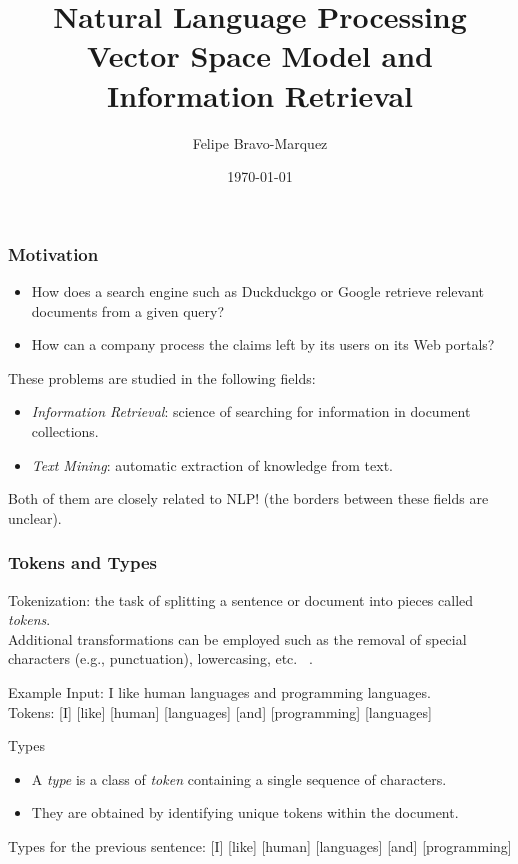 \documentclass[handout]{beamer}
\title{Natural Language Processing \\ Vector Space Model and Information Retrieval}
\author[Felipe Bravo Márquez]{\footnotesize
 \textcolor[rgb]{0.00,0.00,1.00}{Felipe Bravo-Marquez}}
\date{\today}
\begin{document}
\begin{frame}
\titlepage


\end{frame}

\begin{frame}\frametitle{Motivation}


  \begin{itemize}
   \item How does a search engine such as Duckduckgo or Google retrieve relevant documents from a given query?
   \item How can a company process the claims left by its users on its Web portals?
  \end{itemize}

These problems are studied in the following fields:

\begin{itemize}
 \item \emph{Information Retrieval}:  science of searching for information in  document collections.
 \item \emph{Text Mining}: automatic extraction of knowledge from text.
\end{itemize}

Both of them are closely related to NLP! (the borders between these fields are unclear).

\end{frame}

\begin{frame}\frametitle{Tokens and Types}
{\footnotesize
Tokenization: the task of splitting a sentence or document into pieces called \emph{tokens}. \\
Additional transformations can be employed such as the removal of special characters (e.g., punctuation), lowercasing, etc. ~\cite{manning2008}. 

\begin{block}{Example}
Input: I like human languages and programming languages.\\
Tokens: [I] [like] [human] [languages] [and] [programming] [languages]
\end{block}



\begin{block}{Types}
\begin{itemize}
 \item A \emph{type} is a class of \emph{token} containing a single sequence of characters.
\item They are obtained by identifying unique tokens within the document.
\end{itemize}

Types for the previous sentence: [I] [like] [human] [languages] [and] [programming]  \\
\end{block}



 }
\end{frame}
\end{document}
